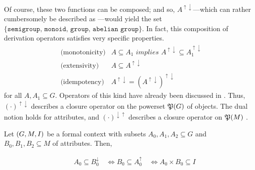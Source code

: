 Of course, these two functions can be composed; and so, $A^{\uparrow \downarrow}$---which can rather cumbersomely be described as ---would yield the set $\{\texttt{semigroup, monoid, group, abelian group}\}$. In fact, this composition of derivation operators satisfies very specific properties.
%
\begin{align}
  & \text{(monotonicity)} & A \subseteq A_1 \textit{ implies } A^{\uparrow \downarrow} \subseteq A_1^{\uparrow \downarrow} \\
  & \text{(extensivity)}  & A \subseteq A^{\uparrow \downarrow} \\
  & \text{(idempotency)}  & A^{\uparrow \downarrow} = (A^{\uparrow \downarrow})^{\uparrow \downarrow}
\end{align}
for all $A, A_1 \subseteq G$.  Operators of this kind have already been discussed in . Thus, $(\cdot)^{\uparrow \downarrow}$ describes a closure operator on the powerset $\mathfrak{P}({G})$ of objects. The dual notion holds for attributes, and $(\cdot)^{\downarrow \uparrow}$ describes a closure operator on $\mathfrak{P}({M})$ \cite[pp. 18]{ganter1999formal}.

\begin{proposition}
  \label{proposition:properties-about-derivation-operators}
  Let $(G,M,\mathrel{I})$ be a formal context with subsets $A_0, A_1, A_2 \subseteq G$ and $B_0, B_1, B_2 \subseteq M$ of attributes. Then,
%

%

%

%
\begin{equation}
\begin{aligned}
& \quad A_0 \subseteq B_0^\downarrow \quad \Longleftrightarrow B_0 \subseteq A_0^\uparrow \quad \Longleftrightarrow A_0 \times B_0 \subseteq I
 \end{aligned}
\end{equation}
\end{proposition}


